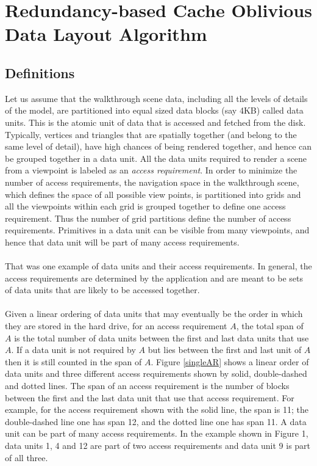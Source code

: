
\section{Redundancy-based Cache Oblivious Data Layout Algorithm}

\subsection{Definitions}

Let us assume that the walkthrough scene data, including all the levels of details of the model, are partitioned into equal sized data blocks (say 4KB) called data units. This is the atomic unit of data that is accessed and fetched from the disk. Typically, vertices and triangles that are spatially together (and belong to the same level of detail), have high chances of being rendered together, and hence can be grouped together in a data unit. All the data units required to render a scene from a viewpoint is labeled as an {\em access requirement}. In order to minimize the number of access requirements, the navigation space in the walkthrough scene, which defines the space of all possible view points, is partitioned into grids and all the viewpoints within each grid is grouped together to define one access requirement. Thus the number of grid partitions define the number of access requirements. Primitives in a data unit can be visible from many viewpoints, and hence that data unit will be part of many access requirements. \\
\\
That was one example of data units and their access requirements. In general, the access requirements are determined by the application and are meant to be sets of data units that are likely to be accessed together. \\
\\
Given a linear ordering of data units that may eventually be the order in which they are stored in the hard drive, for an access requirement $A$, the total span of $A$ is the total number of data units between the first and last data units that use $A$. If a data unit is not required by $A$ but lies between the first and last unit of $A$ then it is still counted in the span of $A$. Figure \ref{singleAR} shows a linear order of data units and three different access requirements shown by solid, double-dashed and dotted lines. The span of an access requirement is the number of blocks between the first and the last data unit that use that access requirement. For example, for the access requirement shown with the solid line, the span is 11; the double-dashed line one has span 12, and the dotted line one has span 11. A data unit can be part of many access requirements. In the example shown in Figure 1, data units 1, 4 and 12 are part of two access requirements and data unit 9 is part of all three. \\
